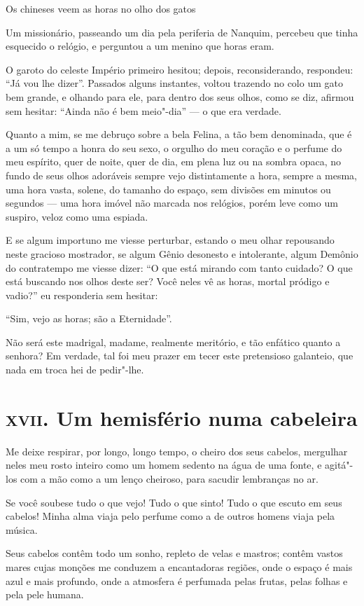 Os chineses veem as horas no olho dos gatos

Um missionário, passeando um dia pela periferia de Nanquim, percebeu que
tinha esquecido o relógio, e perguntou a um menino que horas eram.

O garoto do celeste Império primeiro hesitou; depois, reconsiderando,
respondeu: ``Já vou lhe dizer''. Passados
alguns instantes, voltou trazendo no colo um gato bem grande, e
olhando para ele, para dentro dos seus olhos, como se diz, afirmou sem
hesitar: ``Ainda não é bem meio"-dia'' --- o
que era verdade.

Quanto a mim, se me debruço sobre a bela Felina, a tão bem denominada,
que é a um só tempo a honra do seu sexo, o orgulho do meu coração e o
perfume do meu espírito, quer de noite, quer de dia, em plena luz ou na
sombra opaca, no fundo de seus olhos adoráveis sempre vejo
distintamente a hora, sempre a mesma, uma hora vasta, solene, do tamanho do espaço, sem divisões em minutos ou segundos --- uma hora imóvel
não marcada nos relógios, porém leve como um suspiro,
veloz como uma espiada.

E se algum importuno me viesse perturbar, estando o meu olhar
repousando neste gracioso mostrador, se algum Gênio desonesto e
intolerante, algum Demônio do contratempo me viesse dizer:
``O que está mirando com tanto cuidado? O que está
buscando nos olhos deste ser? Você neles vê as horas, mortal pródigo
e vadio?'' eu responderia sem hesitar: 

``Sim,
vejo as horas; são a Eternidade''.

Não será este madrigal, madame, realmente meritório, e tão enfático
quanto a senhora? Em verdade, tal foi meu prazer em tecer este
pretensioso galanteio, que nada em troca hei de pedir"-lhe.

\chapter{\textsc{xvii.} Um hemisfério numa cabeleira}

Me deixe respirar, por longo, longo tempo, o cheiro dos seus cabelos,
mergulhar neles meu rosto inteiro como um homem sedento na água de uma
fonte, e agitá"-los com a mão como a um lenço cheiroso, para
sacudir lembranças no ar.

Se você soubese tudo o que vejo! Tudo o que sinto! Tudo o que escuto
em seus cabelos! Minha alma viaja pelo perfume como a de
outros homens viaja pela música.

Seus cabelos contêm todo um sonho, repleto de velas e mastros; contêm
vastos mares cujas monções me conduzem a encantadoras regiões, onde o
espaço é mais azul e mais profundo, onde a atmosfera é perfumada pelas
frutas, pelas folhas e pela pele humana.

